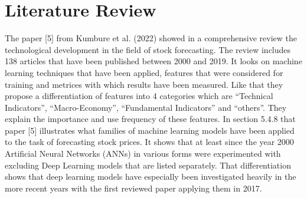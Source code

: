 \documentclass[a4paper,12pt]{report}
\begin{document}
\chapter{Literature Review}
The paper [5] from Kumbure et al. (2022) showed in a comprehensive review the technological development in the field of stock forecasting. The review includes 138 articles that have been published between 2000 and 2019. It looks on machine learning techniques that have been applied, features that were considered for training and metrices with which results have been measured. Like that they propose a differentiation of features into 4 categories which are “Technical Indicators”, “Macro-Economy”, “Fundamental Indicators” and “others”. They explain the importance and use frequency of these features. In section 5.4.8 that paper [5] illustrates what families of machine learning models have been applied to the task of forecasting stock prices. It shows that at least since the year 2000 Artificial Neural Networks (ANNs) in various forms were experimented with excluding Deep Learning models that are listed separately. That differentiation shows that deep learning models have especially been investigated heavily in the more recent years with the first reviewed paper applying them in 2017. 
\end{document}
